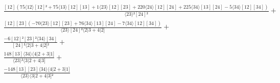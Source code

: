 \documentclass[varwidth, border=5pt]{standalone}
\begin{document}
\begin{my}
$\begin{gathered}
\scriptscriptstyle\frac{[12](75⟨12⟩[12]²+75⟨13⟩[12][13]+1⟨23⟩[12][23]+220⟨24⟩[12][24]+225⟨34⟩[13][24]-5⟨34⟩[12][34])}{⟨23⟩²[24]²} +\\
\scriptscriptstyle\frac{[12][23](-70⟨23⟩[12][23]+76⟨34⟩[13][24]-7⟨34⟩[12][34])}{⟨23⟩[24]²⟨2|3+4|2]} +\\
\scriptscriptstyle\frac{-6[12]²[23]²⟨34⟩[34]}{[24]²⟨2|3+4|2]²} +\\
\scriptscriptstyle\frac{148[13]⟨34⟩⟨4|2+3|1]}{⟨23⟩²⟨3|2+4|3]} +\\
\scriptscriptstyle\frac{-148[13][23]⟨34⟩⟨4|2+3|1]}{⟨23⟩⟨3|2+4|3]²} \phantom{+}
\end{gathered}$
\end{my}
\end{document}
